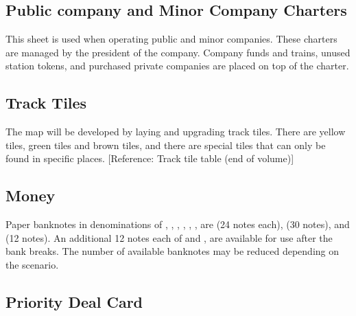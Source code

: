 \documentclass{article}
\begin{document}
\begin{CJK}{UTF8}{min}


\subsection{Public company and Minor Company Charters}
This sheet is used when operating public and minor companies.  These
charters are managed by the president of the company. Company funds
and trains, unused station tokens, and purchased private companies are
placed on top of the charter.



\subsection{Track Tiles}

The map will be developed by laying and upgrading track tiles. There
are yellow tiles, green tiles and brown tiles, and there are special
tiles that can only be found in specific places. [Reference: Track tile
table (end of volume)]



\subsection{Money}

Paper banknotes in denominations of , , , ,
, ,  are (24 notes each),  (30 notes),
and  (12 notes). An additional 12 notes each of  and
, are available for use after the bank breaks. The number of available banknotes may be reduced depending on the scenario.


\subsection{Priority Deal Card}


\end{CJK}
\end{document}
